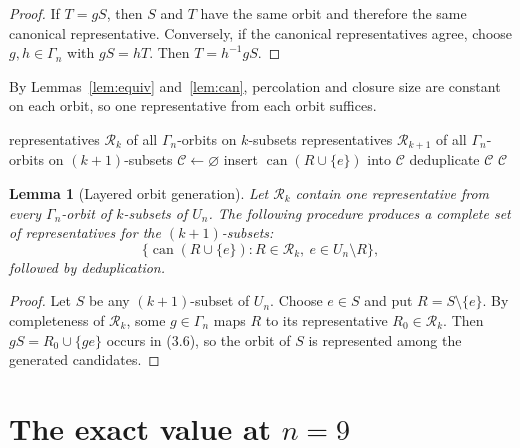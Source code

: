 \documentclass[11pt]{article}
\numberwithin{equation}{section}
\newtheorem{lemma}[theorem]{Lemma}
\begin{document}
\begin{proof}
If $T=gS$, then $S$ and $T$ have the same orbit and therefore the same
canonical representative. Conversely, if the canonical representatives
agree, choose $g,h\in\Gamma_n$ with $gS=hT$. Then
$T=h^{-1}gS$.
\end{proof}

By Lemmas~\ref{lem:equiv} and~\ref{lem:can}, percolation and closure size are
constant on each orbit, so one representative from each orbit suffices.

\begin{algorithm}[t]
\caption{Complete generation of the next orbit layer}
\label{alg:orbits}
\begin{algorithmic}[1]
\Require representatives $\mathcal R_k$ of all $\Gamma_n$-orbits on $k$-subsets
\Ensure representatives $\mathcal R_{k+1}$ of all $\Gamma_n$-orbits on $(k+1)$-subsets
\State $\mathcal C\gets\varnothing$
        \State insert $\operatorname{can}(R\cup\{e\})$ into $\mathcal C$
    \EndFor
\EndFor
\State deduplicate $\mathcal C$
\State \Return $\mathcal C$
\end{algorithmic}
\end{algorithm}

\begin{lemma}[Layered orbit generation]\label{lem:layer}
Let $\mathcal R_k$ contain one representative from every $\Gamma_n$-orbit of $k$-subsets of $U_n$. The following procedure produces a complete set of representatives for the $(k+1)$-subsets:
\[
\{\operatorname{can}(R\cup\{e\}):R\in\mathcal R_k,\ e\in U_n\setminus R\},
\tag{3.6}
\]
followed by deduplication.
\end{lemma}

\begin{proof}
Let $S$ be any $(k+1)$-subset of $U_n$. Choose $e\in S$ and put $R=S\setminus\{e\}$. By completeness of $\mathcal R_k$, some $g\in\Gamma_n$ maps $R$ to its representative $R_0\in\mathcal R_k$. Then $gS=R_0\cup\{ge\}$ occurs in (3.6), so the orbit of $S$ is represented among the generated candidates.
\end{proof}

\section{\texorpdfstring{The exact value at $n=9$}{The exact value at n=9}}\label{sec:n9}
\end{document}

